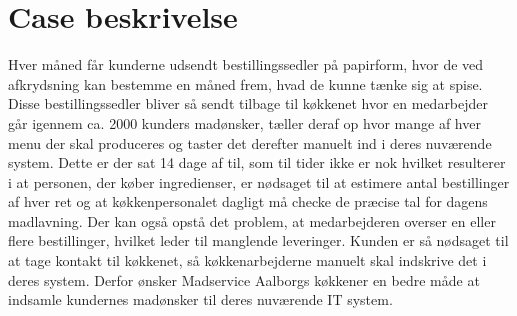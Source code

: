 \section{Case beskrivelse}
Hver måned får kunderne udsendt bestillingssedler på papirform, hvor de ved afkrydsning kan bestemme en måned frem, hvad de kunne tænke sig at spise.
Disse bestillingssedler bliver så sendt tilbage til køkkenet hvor en medarbejder går igennem ca. 2000  kunders madønsker, tæller deraf op hvor mange af hver menu der skal produceres og taster det derefter manuelt ind i deres nuværende system.
Dette er der sat 14 dage af til, som til tider ikke er nok hvilket resulterer i at personen, der køber ingredienser, er nødsaget til at estimere antal bestillinger af hver ret og at køkkenpersonalet dagligt må checke de præcise tal for dagens madlavning.
Der kan også opstå det problem, at medarbejderen overser en eller flere bestillinger, hvilket leder til manglende leveringer.
Kunden er så nødsaget til at tage kontakt til køkkenet, så køkkenarbejderne manuelt skal indskrive det i deres system.
Derfor ønsker Madservice Aalborgs køkkener en bedre måde at indsamle kundernes madønsker til deres nuværende IT system.